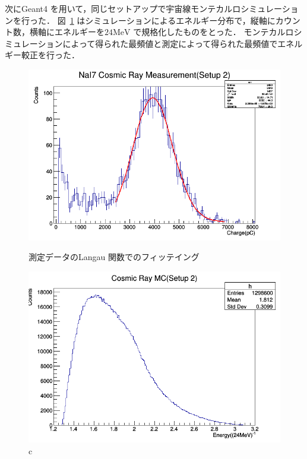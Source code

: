 次にGeant4 を用いて，同じセットアップで宇宙線モンテカルロシミュレーションを行った．
図~\ref{MC2} はシミュレーションによるエネルギー分布で，縦軸にカウント数，横軸にエネルギーを$24\mathrm{MeV}$ で規格化したものをとった．
モンテカルロシミュレーションによって得られた最頻値と測定によって得られた最頻値でエネルギー較正を行った．

\begin{figure}[H]
  \begin{minipage}{0.45\hsize}
    \begin{center}\hspace*{-1em}
  \includegraphics[width=1\textwidth]{figure/tajima/NaI7_Setup2.png}
      \caption{測定データのLangau 関数でのフィッテイング}\label{langau}
    \end{center}
  \end{minipage}\hfill
  \begin{minipage}{0.45\hsize}
    \begin{center}
      \includegraphics[width=1\textwidth]{figure/tajima/MC2.png}
      \caption{c}\label{MC2}
    \end{center}
  \end{minipage}
\end{figure}

